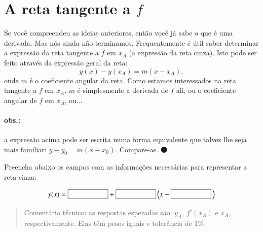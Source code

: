 \documentclass[fleqn,12pt]{scrartcl}
\newenvironment{ct}{\begin{quotation}\color{red!30!black}\sffamily\small Comentário técnico:}{\end{quotation}} %
\newcommand\proceed{\textcolor{green!50!black}{$\medbullet$}\xspace}
\newcommand\shortanswerfield{\framebox[2cm]{\phantom{A}}}
\begin{document}
    \section{A reta tangente a $f$}

    Se você compreendeu as ideias anteriores, então você já sabe o que é uma derivada. Mas nós ainda não terminamos. Frequentemente é útil saber determinar a expressão da reta tangente a $f$ em $x_A$ (a expressão da reta cinza). Isto pode ser feito através da expressão geral da reta:
    \begin{equation*}
	y(x) - y(x_A) = m (x - x_A),
    \end{equation*}
    onde $m$ é o coeficiente angular da reta. Como estamos interessados na reta tangente a $f$ em $x_A$, $m$ é simplesmente a derivada de $f$ ali, ou o coeficiente angular de $f$ em $x_A$, ou...

    \paragraph{obs.:} a expressão acima pode ser escrita numa forma equivalente que talvez lhe seja mais familiar: $y - y_0 = m(x - x_0)$. Compare-as.
\proceed

    Preencha abaixo os campos com as informações necessárias para representar a reta cinza:

    \begin{equation*}
        y(x) = \shortanswerfield + \shortanswerfield \left(x - \shortanswerfield\,\right)
    \end{equation*}

    \begin{ct}
	as respostas esperadas são: $y_A$, $f'(x_A)$ e $x_A$, respectivamente. Elas têm pesos iguais e tolerância de 1\%.
    \end{ct}
\end{document}
